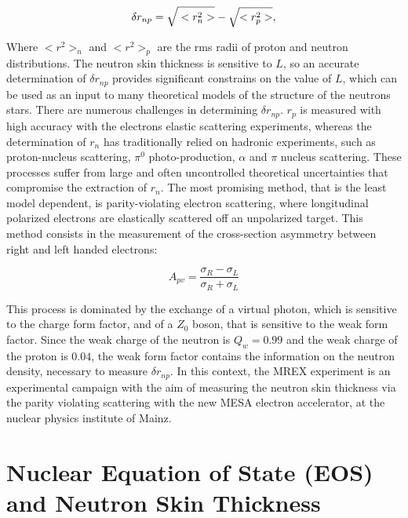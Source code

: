 \begin{equation} \label{eq:NeutronSkin}
\delta r_{np} = \sqrt{\vphantom{r^{2}_{p}}<r^{2}_{n}>} - \sqrt{<r^{2}_{p}>} ,
\end{equation}

Where $<r^{2}>_{n}$ and $<r^{2}>_{p}$ are the rms radii of proton and neutron distributions. The neutron skin thickness is sensitive to $L$, so an accurate determination of $\delta r_{np}$ provides significant constrains on the value of $L$, which can be used as an input to many theoretical models of the structure of the neutrons stars.
There are numerous challenges in determining $\delta r_{np}$. $r_{p}$ is measured with high accuracy with the electrons elastic scattering experiments, whereas the determination of $r_{n}$ has traditionally relied on hadronic experiments, such as proton-nucleus scattering, $\pi^{0}$ photo-production, $\alpha$ and $\pi$ nucleus scattering. These processes suffer from large and often uncontrolled theoretical uncertainties that compromise the extraction of $r_{n}$. The most promising method, that is the least model dependent, is parity-violating electron scattering, where longitudinal polarized electrons are elastically scattered off an unpolarized target. This method consists in the measurement of the cross-section asymmetry between right and left handed electrons:

\begin{equation}
A_{pv} = \dfrac{\sigma_{R} - \sigma_{L}}{\sigma_{R} + \sigma_{L}}
\end{equation}

This process is dominated by the exchange of a virtual photon, which is sensitive to the charge form factor, and of a $Z_{0}$ boson, that is sensitive to the weak form factor. Since the weak charge of the neutron is $Q_{w} = 0.99$ and the weak charge of the proton is $0.04$, the weak form factor contains the information on the neutron density, necessary to measure $\delta r_{np}$. In this context, the MREX experiment is an experimental campaign with the aim of measuring the neutron skin thickness via the parity violating scattering with the new MESA electron accelerator, at the nuclear physics institute of Mainz.

\section{Nuclear Equation of State (EOS) and Neutron Skin Thickness}


